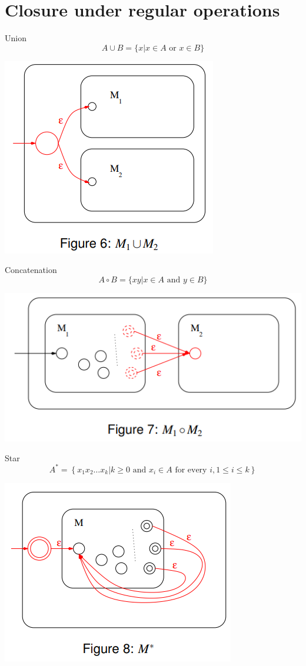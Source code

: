 \documentclass{article}[18pt]
\begin{document}
\section{Closure under regular operations}
Union
\[
A \cup B=\{x | x \in A \text { or } x \in B\}
\]
\begin{center}
	\includegraphics[scale=0.7]{Union}
\end{center}
Concatenation
\[
A \circ B=\{x y | x \in A \text { and } y \in B\}
\]
\begin{center}
	\includegraphics[scale=0.7]{Concatenation}
\end{center}
Star
\[
A^{*}=\left\{x_{1} x_{2} \ldots x_{k} | k \geq 0 \text { and } x_{i} \in A \text { for every } i, 1 \leq i \leq k\right\}
\]
\begin{center}
	\includegraphics[scale=0.7]{Star}
\end{center}
\end{document}
